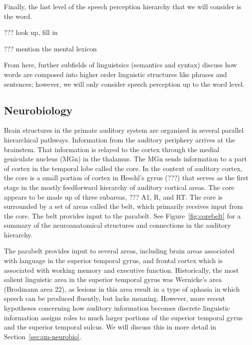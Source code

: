 Finally, the last level
of the speech perception hierarchy
that we will consider is the word.

??? look up, fill in

??? mention the mental lexicon

From here,
further subfields of linguistsics
(semantics and syntax)
discuss how words are composed
into higher order linguistic structures
like phrases and sentences;
however, we will only consider
speech perception up to the word level.

\subsection{Neurobiology}
\label{sec:recog-neurobio}

Brain structures in the primate auditory system
are organized in several parallel
hierarchical pathways.
Information from the auditory periphery
arrives at the brainstem. %
That information is relayed to the cortex
through the medial geniculate nucleus (MGn)
in the thalamus.
The MGn sends information to a part
of cortex in the temporal lobe
called the core.
In the context of auditory cortex,
the core is a small portion of cortex
in Heschl's gyrus (???)
that serves as the first stage
in the mostly feedforward hierarchy
of auditory cortical areas.
The core appears to be made up of
three subareas, ??? A1, R, and RT.
The core is surrounded by a set of areas
called the belt,
which primarily receives input from
the core.
The belt provides input
to the parabelt.
See Figure~\ref{fig:corebelt} for a summary of
the neuroanatomical structures and connections
in the auditory hierarchy.


The parabelt provides input
to several areas,
including brain areas
associated with language
in the superior temporal gyrus,
and frontal cortex which is associated
with working memory and executive function.
Historically, the most
salient linguistic area
in the superior temporal gyrus
was Wernicke's area (Brodmann area 22),
as lesions in this area result in
a type of aphasia in which
speech can be produced fluently,
but lacks meaning.
However, more recent hypotheses
concerning how auditory information
becomes discrete linguistic information
assigns roles to much larger portions
of the superior temporal gyrus
and the superior temporal sulcus.
We will discuss this in more detail
in Section~\ref{sec:sm-neurobio}.

